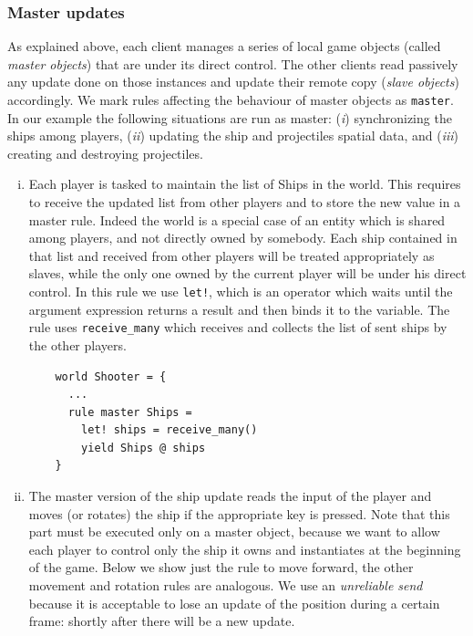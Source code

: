 \subsubsection*{Master updates}
As explained above, each client manages a series of local game objects (called \textit{master objects}) that are under its direct control. The other clients read passively any update done on those instances and update their remote copy  (\textit{slave objects}) accordingly. We mark rules affecting the behaviour of master objects as \texttt{master}. In our example the following situations are run as master: (\textit{i}) synchronizing the ships among players, (\textit{ii}) updating the ship and projectiles spatial data, and (\textit{iii}) creating and destroying projectiles.

\begin{enumerate}[(i)]
	\item Each player is tasked to maintain the list of Ships in the world. This requires to receive the updated list from other players and to store the new value in a master rule. Indeed the world is a special case of an entity which is shared among players, and not directly owned by somebody. Each ship contained in that list and received from other players will be treated appropriately as slaves, while the only one owned by the current player will be under his direct control. In this rule we use \texttt{let!}, which is an operator which waits until the argument expression returns a result and then binds it to the variable. The rule uses \texttt{receive\_many} which receives and collects the list of sent ships by the other players.
	
	\begin{lstlisting}
	world Shooter = {
	  ...
	  rule master Ships =
	    let! ships = receive_many()
	    yield Ships @ ships
	}
	\end{lstlisting}
	
	\item The master version of the ship update reads the input of the player and moves (or rotates) the ship if the appropriate key is pressed. Note that this part must be executed only on a master object, because we want to allow each player to control only the ship it owns and instantiates at the beginning of the game. Below we show just the rule to move forward, the other movement and rotation rules are analogous. We use an \textit{unreliable send} because it is acceptable to lose an update of the position during a certain frame: shortly after there will be a new update.
	

\end{enumerate}
